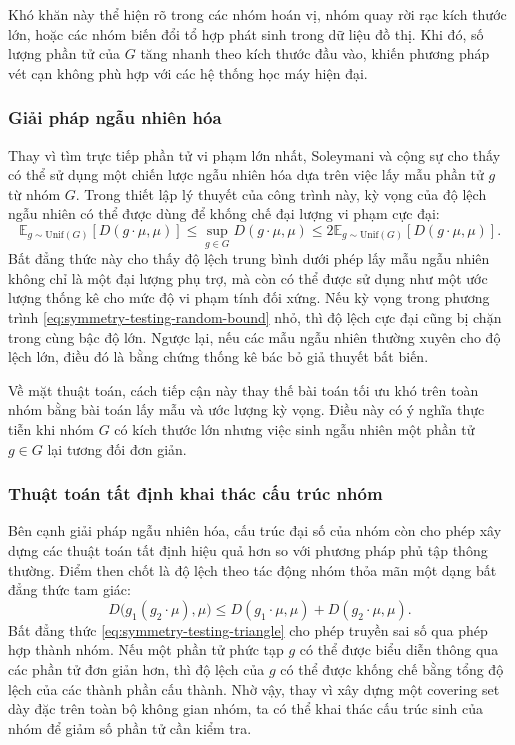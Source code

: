 Khó khăn này thể hiện rõ trong các nhóm hoán vị, nhóm quay rời rạc kích thước lớn, hoặc các nhóm biến đổi tổ hợp phát sinh trong dữ liệu đồ thị. Khi đó, số lượng phần tử của $G$ tăng nhanh theo kích thước đầu vào, khiến phương pháp vét cạn không phù hợp với các hệ thống học máy hiện đại.

\subsubsection{Giải pháp ngẫu nhiên hóa}

Thay vì tìm trực tiếp phần tử vi phạm lớn nhất, Soleymani và cộng sự cho thấy có thể sử dụng một chiến lược ngẫu nhiên hóa dựa trên việc lấy mẫu phần tử $g$ từ nhóm $G$. Trong thiết lập lý thuyết của công trình này, kỳ vọng của độ lệch ngẫu nhiên có thể được dùng để khống chế đại lượng vi phạm cực đại:
\begin{equation}
    \mathbb{E}_{g \sim \mathrm{Unif}(G)}
    \left[
        D(g \cdot \mu, \mu)
    \right]
    \leq
    \sup_{g \in G} D(g \cdot \mu, \mu)
    \leq
    2
    \mathbb{E}_{g \sim \mathrm{Unif}(G)}
    \left[
        D(g \cdot \mu, \mu)
    \right].
    \label{eq:symmetry-testing-random-bound}
\end{equation}
Bất đẳng thức này cho thấy độ lệch trung bình dưới phép lấy mẫu ngẫu nhiên không chỉ là một đại lượng phụ trợ, mà còn có thể được sử dụng như một ước lượng thống kê cho mức độ vi phạm tính đối xứng. Nếu kỳ vọng trong phương trình \eqref{eq:symmetry-testing-random-bound} nhỏ, thì độ lệch cực đại cũng bị chặn trong cùng bậc độ lớn. Ngược lại, nếu các mẫu ngẫu nhiên thường xuyên cho độ lệch lớn, điều đó là bằng chứng thống kê bác bỏ giả thuyết bất biến.

Về mặt thuật toán, cách tiếp cận này thay thế bài toán tối ưu khó trên toàn nhóm bằng bài toán lấy mẫu và ước lượng kỳ vọng. Điều này có ý nghĩa thực tiễn khi nhóm $G$ có kích thước lớn nhưng việc sinh ngẫu nhiên một phần tử $g \in G$ lại tương đối đơn giản.

\subsubsection{Thuật toán tất định khai thác cấu trúc nhóm}

Bên cạnh giải pháp ngẫu nhiên hóa, cấu trúc đại số của nhóm còn cho phép xây dựng các thuật toán tất định hiệu quả hơn so với phương pháp phủ tập thông thường. Điểm then chốt là độ lệch theo tác động nhóm thỏa mãn một dạng bất đẳng thức tam giác:
\begin{equation}
    D\bigl(g_1(g_2 \cdot \mu), \mu\bigr)
    \leq
    D(g_1 \cdot \mu, \mu)
    +
    D(g_2 \cdot \mu, \mu).
    \label{eq:symmetry-testing-triangle}
\end{equation}
Bất đẳng thức \eqref{eq:symmetry-testing-triangle} cho phép truyền sai số qua phép hợp thành nhóm. Nếu một phần tử phức tạp $g$ có thể được biểu diễn thông qua các phần tử đơn giản hơn, thì độ lệch của $g$ có thể được khống chế bằng tổng độ lệch của các thành phần cấu thành. Nhờ vậy, thay vì xây dựng một covering set dày đặc trên toàn bộ không gian nhóm, ta có thể khai thác cấu trúc sinh của nhóm để giảm số phần tử cần kiểm tra.


